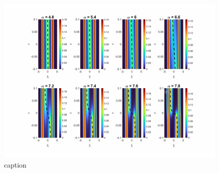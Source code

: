 \documentclass[prb,twocolumn,showpacs,preprintnumbers,amsmath,amssymb, superscriptaddress]{revtex4-2}
\newcommand{\1}{{1\hspace*{-0.5ex} \textrm{l} \hspace*{0.5ex}}}
\begin{document}
\begin{figure}[h!]
    \begin{center}
     \includegraphics[width=2\columnwidth]{SupMatFig_DensitySeries}
     \caption{caption}
     \label{fig:experimental_setup}
    \end{center}
     \end{figure}


\end{document}
